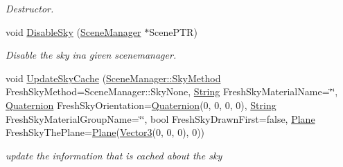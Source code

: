 \begin{DoxyCompactItemize}
\begin{DoxyCompactList}\small\item\em Destructor. \item\end{DoxyCompactList}\item 
void \hyperlink{classMezzanine_1_1internal_1_1SceneManagerData_aa5a2252a2c0c8d8736ad2ca1a33d251a}{DisableSky} (\hyperlink{classMezzanine_1_1SceneManager}{SceneManager} $\ast$ScenePTR)
\begin{DoxyCompactList}\small\item\em Disable the sky ina given scenemanager. \item\end{DoxyCompactList}\item 
\hypertarget{classMezzanine_1_1internal_1_1SceneManagerData_a58daa2cd7db2ffd13aa6191a481ff26c}{
void \hyperlink{classMezzanine_1_1internal_1_1SceneManagerData_a58daa2cd7db2ffd13aa6191a481ff26c}{UpdateSkyCache} (\hyperlink{classMezzanine_1_1SceneManager_a80fac0c0b67191cb5450bddde74b470e}{SceneManager::SkyMethod} FreshSkyMethod=SceneManager::SkyNone, \hyperlink{namespaceMezzanine_acf9fcc130e6ebf08e3d8491aebcf1c86}{String} FreshSkyMaterialName=\char`\"{}\char`\"{}, \hyperlink{classMezzanine_1_1Quaternion}{Quaternion} FreshSkyOrientation=\hyperlink{classMezzanine_1_1Quaternion}{Quaternion}(0, 0, 0, 0), \hyperlink{namespaceMezzanine_acf9fcc130e6ebf08e3d8491aebcf1c86}{String} FreshSkyMaterialGroupName=\char`\"{}\char`\"{}, bool FreshSkyDrawnFirst=false, \hyperlink{classMezzanine_1_1Plane}{Plane} FreshSkyThePlane=\hyperlink{classMezzanine_1_1Plane}{Plane}(\hyperlink{classMezzanine_1_1Vector3}{Vector3}(0, 0, 0), 0))}
\label{classMezzanine_1_1internal_1_1SceneManagerData_a58daa2cd7db2ffd13aa6191a481ff26c}

\begin{DoxyCompactList}\small\item\em update the information that is cached about the sky \item\end{DoxyCompactList}\end{DoxyCompactItemize}
